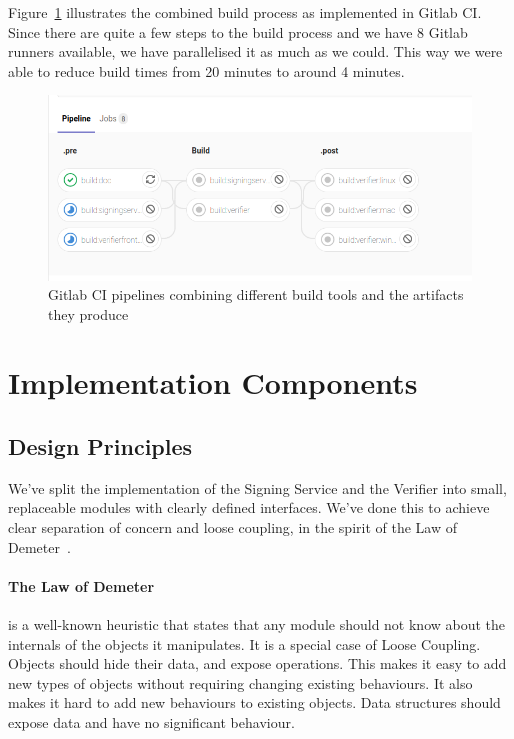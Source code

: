 Figure~\ref{fig:pipelines} illustrates the combined build process as implemented in Gitlab \gls{CI}.
Since there are quite a few steps to the build process and we have 8 Gitlab runners available,
we have parallelised it as much as we could.
This way we were able to reduce build times from 20 minutes to around 4 minutes.


\begin{figure}
    \begin{center}
        \includegraphics[width=0.7\linewidth]{images/pipelines.png}
        \caption{Gitlab CI pipelines combining different build tools and the artifacts they produce}
        \label{fig:pipelines}
    \end{center}
\end{figure}

\section{Implementation Components}\label{sec:implementation-components}
\subsection{Design Principles}\label{subsec:design-principles}
We've split the implementation of the Signing Service and the Verifier into small,
replaceable modules with clearly defined interfaces.
We've done this to achieve clear separation of concern and loose coupling,
in the spirit of the Law of Demeter~\cite{demeter}.

\paragraph{The Law of Demeter} is a well-known heuristic that states that any module should not know about the
internals of the objects it manipulates.
It is a special case of Loose Coupling.
Objects should hide their data, and expose operations.
This makes it easy to add new types of objects without requiring changing existing behaviours.
It also makes it hard to add new behaviours to existing objects.
Data structures should expose data and have no significant behaviour.


